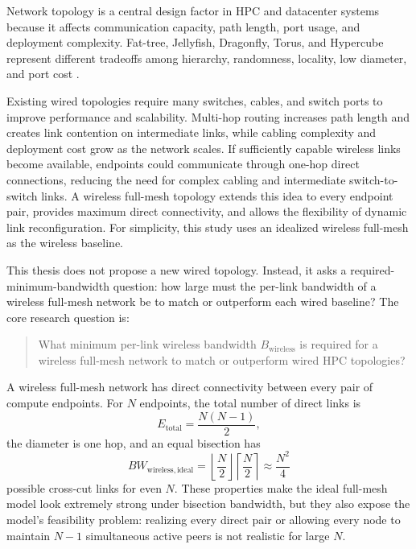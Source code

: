 \documentclass[conference]{IEEEtran}
\begin{document}
Network topology is a central design factor in HPC and datacenter systems because it affects communication capacity, path length, port usage, and deployment complexity. Fat-tree, Jellyfish, Dragonfly, Torus, and Hypercube represent different tradeoffs among hierarchy, randomness, locality, low diameter, and port cost \cite{alfares2008,singla2012,kim2008,aroca2014,leighton1992}.

Existing wired topologies require many switches, cables, and switch ports to improve performance and scalability. Multi-hop routing increases path length and creates link contention on intermediate links, while cabling complexity and deployment cost grow as the network scales. If sufficiently capable wireless links become available, endpoints could communicate through one-hop direct connections, reducing the need for complex cabling and intermediate switch-to-switch links. A wireless full-mesh topology extends this idea to every endpoint pair, provides maximum direct connectivity, and allows the flexibility of dynamic link reconfiguration. For simplicity, this study uses an idealized wireless full-mesh as the wireless baseline.

This thesis does not propose a new wired topology. Instead, it asks a required-minimum-bandwidth question: how large must the per-link bandwidth of a wireless full-mesh network be to match or outperform each wired baseline? The core research question is:
\begin{quote}
What minimum per-link wireless bandwidth \(B_{\mathrm{wireless}}\) is required for a wireless full-mesh network to match or outperform wired HPC topologies?
\end{quote}

A wireless full-mesh network has direct connectivity between every pair of compute endpoints. For \(N\) endpoints, the total number of direct links is
\begin{equation}
E_{\mathrm{total}} = \frac{N(N-1)}{2},
\end{equation}
the diameter is one hop, and an equal bisection has
\begin{equation}
BW_{\mathrm{wireless,ideal}}
=
\left\lfloor\frac{N}{2}\right\rfloor
\left\lceil\frac{N}{2}\right\rceil
\approx
\frac{N^2}{4}
\end{equation}
possible cross-cut links for even \(N\). These properties make the ideal full-mesh model look extremely strong under bisection bandwidth, but they also expose the model's feasibility problem: realizing every direct pair or allowing every node to maintain \(N-1\) simultaneous active peers is not realistic for large \(N\).
\end{document}
